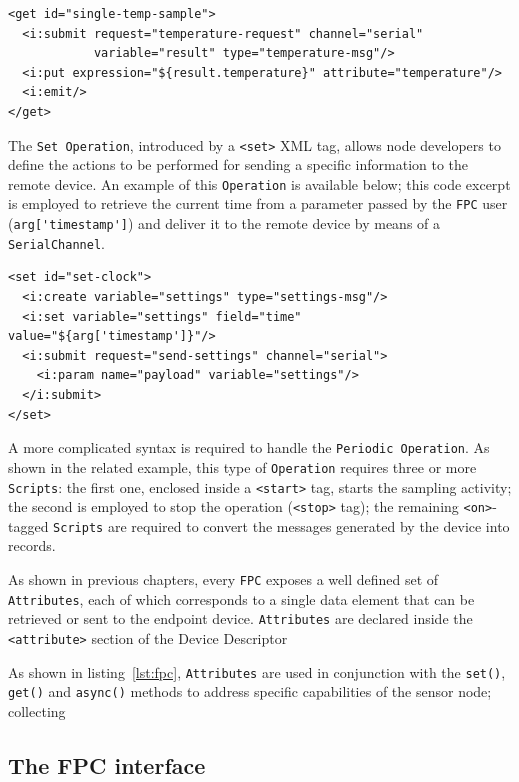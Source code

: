 \lstset{language=XML}
\begin{lstlisting}
<get id="single-temp-sample">
  <i:submit request="temperature-request" channel="serial"
            variable="result" type="temperature-msg"/>
  <i:put expression="${result.temperature}" attribute="temperature"/>
  <i:emit/>
</get>
\end{lstlisting}

The \texttt{Set Operation}, introduced by a \lstinline!<set>! XML tag, allows
node developers to define the actions to be performed for sending a specific
information to the remote device. An example of this \texttt{Operation} is
available below; this code excerpt is employed to retrieve the current time
from a parameter passed by the \texttt{FPC} user (\lstinline!arg['timestamp']!)
and deliver it to the remote device by means of a \texttt{SerialChannel}.

\lstset{language=XML}
\begin{lstlisting}
<set id="set-clock">
  <i:create variable="settings" type="settings-msg"/>
  <i:set variable="settings" field="time" value="${arg['timestamp']}"/>
  <i:submit request="send-settings" channel="serial">
    <i:param name="payload" variable="settings"/>
  </i:submit>
</set>
\end{lstlisting}

A more complicated syntax is required to handle the \texttt{Periodic
Operation}. As shown in the related example, this type of \texttt{Operation}
requires three or more \texttt{Scripts}: the first one, enclosed inside a
\lstinline!<start>! tag, starts the sampling activity; the second is employed
to stop the operation (\lstinline!<stop>! tag); the remaining
\lstinline!<on>!-tagged \texttt{Scripts} are required to convert the messages
generated by the device into records.


As shown in previous chapters, every \texttt{FPC} exposes a well defined set of
\texttt{Attributes}, each of which corresponds to a single data element that
can be retrieved or sent to the endpoint device. \texttt{Attributes} are
declared inside the \lstinline!<attribute>! section of the Device Descriptor


As shown in listing~\ref{lst:fpc}, \texttt{Attributes} are
used in conjunction with the \texttt{set()}, \texttt{get()} and
\texttt{async()} methods to address specific capabilities of the sensor node;
collecting  

\subsection{The FPC interface}

